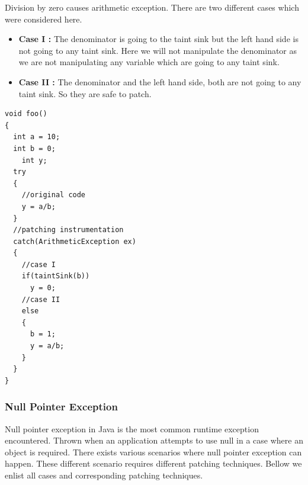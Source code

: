 \documentclass{sigplanconf}
\begin{document}
Division by zero causes arithmetic exception. There are two different cases which were considered here. 
\begin{itemize}
	\item \textbf{Case I :} The denominator is going to the taint sink but the left hand side is not going to any taint sink. 
	Here we will not manipulate the denominator as we are not manipulating any variable which are going to any taint sink.
	\item \textbf{Case II :} The denominator and the left hand side, both are not going to any taint sink. So they are safe to patch.
\end{itemize}

\lstset{language=Java, caption=arithmetic exception : division-by-zero patching, label=patchingexample2}

\begin{lstlisting}
void foo()
{
  int a = 10;
  int b = 0;
	int y;
  try
  {
    //original code
    y = a/b;
  }
  //patching instrumentation
  catch(ArithmeticException ex)
  {
    //case I
    if(taintSink(b))
      y = 0;
    //case II
    else
    {
      b = 1;
      y = a/b;
    }
  }
}
\end{lstlisting}

\subsubsection{Null Pointer Exception}

Null pointer exception in Java is the most common runtime exception encountered. 
Thrown when an application attempts to use null in a case where an object is
required. There exists various scenarios where null pointer exception can
happen. These different scenario requires different patching techniques. Bellow
we enlist all cases and corresponding patching techniques.
\end{document}
